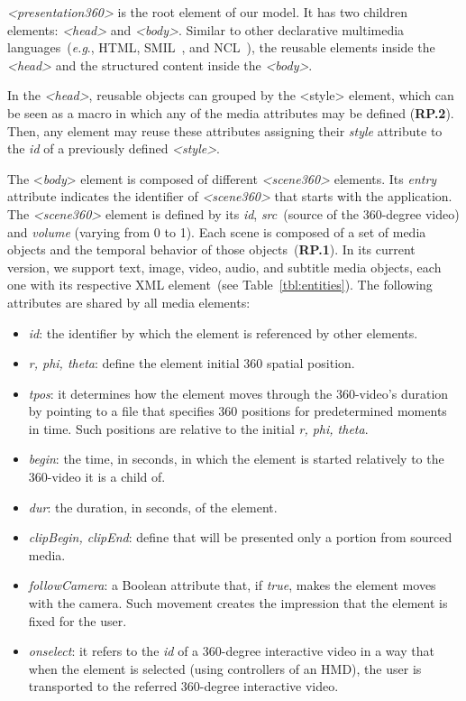 \emph{<presentation360>} is the root element of our model.
It has two children elements: \emph{<head>} and \emph{<body>}.
Similar to other declarative multimedia languages~(\emph{e.g}., HTML, SMIL~\cite{ayers2001synchronized},
and NCL~\cite{soares2006nested}), the reusable elements inside the \emph{<head>} and the structured
content inside the \emph{<body>}.

In the \emph{<head>},  reusable objects can grouped by the <style> element,
which can be seen as a macro in which any of the media attributes may be
defined (\textbf{RP.2}).
Then, any element may reuse these attributes assigning their \emph{style}
attribute to the \emph{id} of a previously defined \emph{<style>}.

The <\emph{body}> element is composed of different \emph{\emph{<scene360>}}
elements.
Its \emph{entry} attribute indicates the identifier of \textit{<scene360>} that
starts with the application.
The \emph{<scene360>} element is defined by its \emph{id}, \emph{src}~(source
of the 360-degree video) and \emph{volume} (varying from 0 to 1). 
Each scene is composed of a set of media objects and the temporal behavior of
those objects~(\textbf{RP.1}).
In its current version, we support text, image, video, audio, and
subtitle media objects, each one with its respective XML element~(see
Table~\ref{tbl:entities}).
The following attributes are shared by all media elements:

\begin{itemize}
  \item \emph{id}: the identifier by which the element is referenced by other elements.
  \item \emph{r, phi, theta}: define the element initial 360 spatial position.
  \item \emph{tpos}: it determines how the element moves through the 360-video's duration by pointing to a file that specifies 360 positions for predetermined moments in time. Such positions are relative to the initial \emph{r, phi, theta}.    
  \item \emph{begin}: the time, in seconds, in which the element is started relatively to the 360-video it is a child of.
  \item \emph{dur}: the duration, in seconds, of the element.
  \item \emph{clipBegin, clipEnd}: define that will be presented only a portion from sourced media.
  \item \emph{followCamera}: a Boolean attribute that, if \emph{true}, makes the element moves with the camera. Such movement creates the impression that the element is fixed for the user.
  \item \emph{onselect}: it refers to the \emph{id} of a 360-degree interactive video in a way that when the element is selected (using controllers of an HMD), the user is transported to the referred 360-degree interactive video.
\end{itemize}

